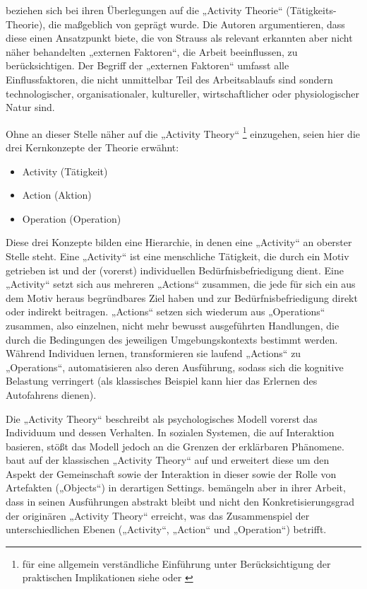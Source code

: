 \citet{Fjuk97} beziehen sich bei ihren Überlegungen auf die „Activity Theorie“ (Tätigkeits-Theorie), die maßgeblich von \citet{Leontev72} geprägt wurde. Die Autoren argumentieren, dass diese einen Ansatzpunkt biete, die von Strauss als relevant erkannten aber nicht näher behandelten „externen Faktoren“, die Arbeit beeinflussen, zu berücksichtigen. Der Begriff der „externen Faktoren“ umfasst alle Einflussfaktoren, die nicht unmittelbar Teil des Arbeitsablaufs sind sondern technologischer, organisationaler, kultureller, wirtschaftlicher oder physiologischer Natur sind. 

Ohne an dieser Stelle näher auf die „Activity Theory“ \footnote{für eine allgemein verständliche Einführung unter Berücksichtigung der praktischen Implikationen siehe \citet{Dahme97} oder \citet{Nardi06}} einzugehen, seien hier die drei Kernkonzepte der Theorie erwähnt:
\begin{itemize}
	\item Activity (Tätigkeit)
	\item Action (Aktion)
	\item Operation (Operation)
\end{itemize}

Diese drei Konzepte bilden eine Hierarchie, in denen eine „Activity“ an oberster Stelle steht. Eine „Activity“ ist eine menschliche Tätigkeit, die durch ein Motiv getrieben ist und der (vorerst) individuellen Bedürfnisbefriedigung dient. Eine „Activity“ setzt sich aus mehreren „Actions“ zusammen, die jede für sich ein aus dem Motiv heraus begründbares Ziel haben und zur Bedürfnisbefriedigung direkt oder indirekt beitragen. „Actions“ setzen sich wiederum aus „Operations“ zusammen, also einzelnen, nicht mehr bewusst ausgeführten Handlungen, die durch die Bedingungen des jeweiligen Umgebungskontexts bestimmt werden. Während Individuen lernen, transformieren sie laufend „Actions“ zu „Operations“, automatisieren also deren Ausführung, sodass sich die kognitive Belastung verringert (als klassisches Beispiel kann hier das Erlernen des Autofahrens dienen).

Die „Activity Theory“ beschreibt als psychologisches Modell vorerst das Individuum und dessen Verhalten. In sozialen Systemen, die auf Interaktion basieren, stößt das Modell jedoch an die Grenzen der erklärbaren Phänomene. \citet{Engestrom87} baut auf der klassischen „Activity Theory“ auf und erweitert diese um den Aspekt der Gemeinschaft sowie der Interaktion in dieser sowie der Rolle von Artefakten („Objects“) in derartigen Settings. \citet{Fjuk97} bemängeln aber in ihrer Arbeit, dass \citeauthor{Engestrom87} in seinen Ausführungen abstrakt bleibt und nicht den Konkretisierungsgrad der originären „Activity Theory“ erreicht, was das Zusammenspiel der unterschiedlichen Ebenen („Activity“, „Action“ und „Operation“) betrifft.

